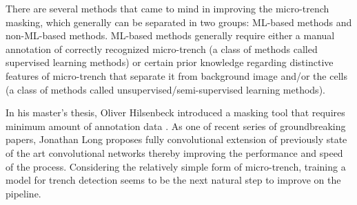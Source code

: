 \documentclass[pdftex,12pt,a4paper]{report}
\begin{document}
There are several methods that came to mind in improving the micro-trench masking, which generally can be separated in two groups: ML-based methods and non-ML-based methods. ML-based methods generally require either a manual annotation of correctly recognized micro-trench (a class of methods called supervised learning methods) or certain prior knowledge regarding distinctive features of micro-trench that separate it from background image and/or the cells (a class of methods called unsupervised/semi-supervised learning methods).

In his master's thesis, Oliver Hilsenbeck introduced a masking tool that requires minimum amount of annotation data \cite{hilsenbeck2014maximally}. As one of recent series of groundbreaking papers, Jonathan Long proposes fully convolutional extension \cite{long2015fully} of previously state of the art convolutional networks \cite{simonyan2014very, szegedy2015going} thereby improving the performance and speed of the process. Considering the relatively simple form of micro-trench, training a model for trench detection seems to be the next natural step to improve on the pipeline.






\end{document}

